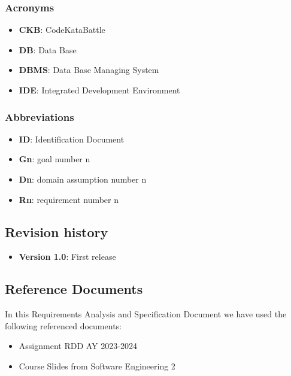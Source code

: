 \documentclass[12pt,oneside,a4paper]{article}
\begin{document}
\subsubsection{Acronyms}
\begin{itemize}
    \item \textbf{CKB}: CodeKataBattle
    \item \textbf{DB}: Data Base
    \item \textbf{DBMS}: Data Base Managing System
    \item \textbf{IDE}: Integrated Development Environment
\end{itemize}
\subsubsection{Abbreviations}
\begin{itemize}
    \item \textbf{ID}: Identification Document
    \item \textbf{Gn}: goal number n
    \item \textbf{Dn}: domain assumption number n
    \item \textbf{Rn}: requirement number n
\end{itemize}
\subsection{Revision history}
\begin{itemize}
    \item \textbf{Version 1.0}: First release
\end{itemize}

\subsection{Reference Documents}
In this Requirements Analysis and Specification Document we have used the following referenced documents:

\begin{itemize}
    \item Assignment RDD AY 2023-2024
    \item Course Slides from Software Engineering 2
\end{itemize}
\end{document}
